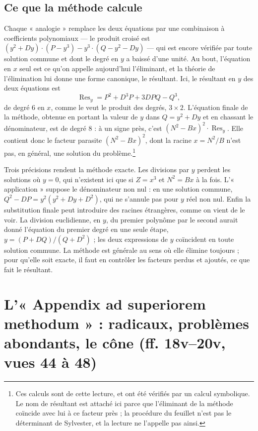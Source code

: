 \documentclass[11pt,a4paper]{article}
\begin{document}
\subsection*{Ce que la méthode calcule}

Chaque « analogie » remplace les deux équations par une combinaison à
coefficients polynomiaux — le produit croisé est
$(y^2 + Dy)\cdot(P - y^3) - y^3\cdot(Q - y^2 - Dy)$ — qui est encore vérifiée
par toute solution commune et dont le degré en $y$ a baissé d'une unité. Au
bout, l'équation en $x$ seul est ce qu'on appelle aujourd'hui l'éliminant, et
la théorie de l'élimination lui donne une forme canonique, le résultant. Ici,
le résultant en $y$ des deux équations est
\[ \operatorname{Res}_y = P^2 + D^3P + 3DPQ - Q^3 , \]
de degré 6 en $x$, comme le veut le produit des degrés, $3\times 2$.
L'équation finale de la méthode, obtenue en portant la valeur de $y$ dans
$Q = y^2 + Dy$ et en chassant le dénominateur, est de degré 8 : à un signe
près, c'est $(N^2 - Bx)^2\cdot\operatorname{Res}_y$. Elle contient donc le
facteur parasite $(N^2 - Bx)^2$, dont la racine $x = N^2/B$ n'est pas, en
général, une solution du problème.\footnote{Ces calculs sont de cette lecture,
et ont été vérifiés par un calcul symbolique. Le nom de résultant est attaché
ici parce que l'éliminant de la méthode coïncide avec lui à ce facteur près ;
la procédure du feuillet n'est pas le déterminant de Sylvester, et la lecture
ne l'appelle pas ainsi.}

Trois précisions rendent la méthode exacte. Les divisions par $y$ perdent les
solutions où $y = 0$, qui n'existent ici que si $Z = x^3$ et $N^2 = Bx$ à la
fois. L'« application » suppose le dénominateur non nul : en une solution
commune, $Q^2 - DP = y^2(y^2 + Dy + D^2)$, qui ne s'annule pas pour $y$ réel
non nul. Enfin la substitution finale peut introduire des racines étrangères,
comme on vient de le voir. La division euclidienne, en $y$, du premier
polynôme par le second aurait donné l'équation du premier degré en une seule
étape, $y = (P + DQ)/(Q + D^2)$ ; les deux expressions de $y$ coïncident en
toute solution commune. La méthode est générale au sens où elle élimine
toujours ; pour qu'elle soit exacte, il faut en contrôler les facteurs perdus
et ajoutés, ce que fait le résultant.

\section*{L'« Appendix ad superiorem methodum » : radicaux, problèmes abondants, le cône (ff. 18v–20v, vues 44 à 48)}
\end{document}
